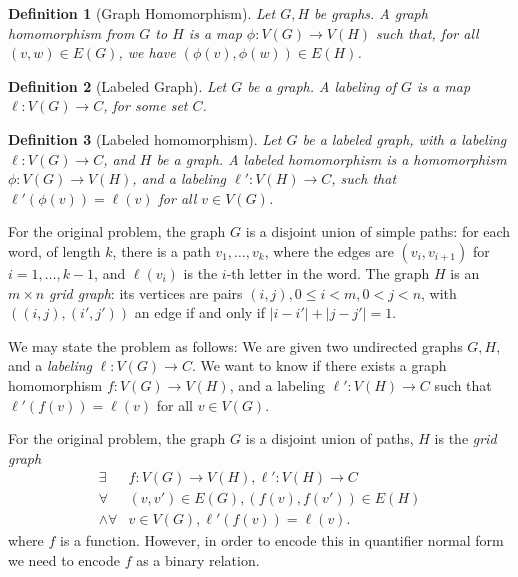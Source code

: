 \documentclass{article}
\newtheorem{definition}{Definition}
\begin{document}
\begin{definition}[Graph Homomorphism]
  Let $G, H$ be graphs.  A \emph{graph homomorphism} from $G$ to $H$
  is a map $\phi : V(G) \rightarrow V(H)$ such that, for all $(v,w) \in
  E(G)$, we have $(\phi(v), \phi(w)) \in E(H)$.
\end{definition}
\begin{definition}[Labeled Graph]
  Let $G$ be a graph.  A \emph{labeling} of $G$ is a map $\ell: V(G)
  \rightarrow C$, for some set $C$.
\end{definition}
\begin{definition}[Labeled homomorphism]
  Let $G$ be a labeled graph, with a \emph{labeling} $\ell: V(G)
  \rightarrow C$, and $H$
  be a graph.  A \emph{labeled homomorphism} is a homomorphism $\phi:
  V(G) \rightarrow V(H)$, and a labeling $\ell': V(H) \rightarrow C$,
  such that $\ell'(\phi(v)) = \ell(v)$ for all $v \in V(G)$.
\end{definition}

For the original problem, the graph $G$ is a disjoint union of simple
paths: for each word, of length $k$, there is a path $v_1, \dots,
v_k$, where the edges are $(v_i, v_{i+1})$ for $i=1, \dots, k-1$, and
$\ell(v_i)$ is the $i$-th letter in the word.  The graph $H$ is an $m
\times n$ \emph{grid graph}: its vertices are pairs $(i,j), 0 \le i <
m, 0 < j < n$, with $((i,j), (i',j'))$ an edge if and only if
$|i-i'| + |j-j'| = 1$.

We may state the problem as follows: We are given two
undirected graphs $G, H$, and a \emph{labeling} $\ell : V(G)
\rightarrow C$.  We want to know if there exists a graph homomorphism
$f: V(G) \rightarrow V(H)$, and a labeling $\ell': V(H) \rightarrow C$
such that $\ell'(f(v)) = \ell(v)$ for all $v \in V(G)$.


For the original problem, the graph $G$ is a disjoint union of paths,
$H$ is the \emph{grid graph}
\begin{equation}
  \label{eq:1}
  \begin{aligned}
    \exists & f: V(G) \rightarrow V(H), \ell': V(H) \rightarrow C \\
    \forall & (v,v') \in E(G), (f(v), f(v')) \in E(H) \\
    \wedge \forall & v \in V(G), \ell'(f(v)) = \ell(v).
  \end{aligned}
\end{equation}
where $f$ is a function.  However, in order to encode this in
quantifier normal form we need to encode $f$ as a binary relation.
\end{document}
